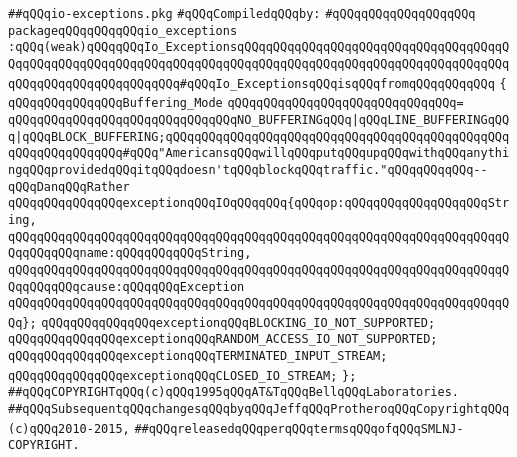 \label{src/lib/std/src/io/io-exceptions.pkg}
\verb|##qQQqio-exceptions.pkg|\newline
\newline
\verb|#qQQqCompiledqQQqby:|\newline
\verb|#qQQqqQQqqQQqqQQqqQQq|\newline
\newline
\verb|packageqQQqqQQqqQQqio_exceptions|\newline
\verb|:qQQq(weak)qQQqqQQqIo_ExceptionsqQQqqQQqqQQqqQQqqQQqqQQqqQQqqQQqqQQqqQQqqQQqqQQqqQQqqQQqqQQqqQQqqQQqqQQqqQQqqQQqqQQqqQQqqQQqqQQqqQQqqQQqqQQqqQQqqQQqqQQqqQQqqQQqqQQq#qQQqIo_ExceptionsqQQqisqQQqfromqQQqqQQqqQQq|\newline
\verb|{|\newline
\verb|qQQqqQQqqQQqqQQqBuffering_Mode|\newline
\verb|qQQqqQQqqQQqqQQqqQQqqQQqqQQqqQQq=|\newline
\verb|qQQqqQQqqQQqqQQqqQQqqQQqqQQqqQQqNO_BUFFERINGqQQq|\verb#|qQQqLINE_BUFFERINGqQQq|qQQqBLOCK_BUFFERING;qQQqqQQqqQQqqQQqqQQqqQQqqQQqqQQqqQQqqQQqqQQqqQQqqQQqqQQqqQQqqQQq#\verb|#qQQq"AmericansqQQqwillqQQqputqQQqupqQQqwithqQQqanythingqQQqprovidedqQQqitqQQqdoesn'tqQQqblockqQQqtraffic."qQQqqQQqqQQq--qQQqDanqQQqRather|\newline
\newline
\verb|qQQqqQQqqQQqqQQqexceptionqQQqIOqQQqqQQq{qQQqop:qQQqqQQqqQQqqQQqqQQqString,|\newline
\verb|qQQqqQQqqQQqqQQqqQQqqQQqqQQqqQQqqQQqqQQqqQQqqQQqqQQqqQQqqQQqqQQqqQQqqQQqqQQqqQQqname:qQQqqQQqqQQqString,|\newline
\verb|qQQqqQQqqQQqqQQqqQQqqQQqqQQqqQQqqQQqqQQqqQQqqQQqqQQqqQQqqQQqqQQqqQQqqQQqqQQqqQQqcause:qQQqqQQqException|\newline
\verb|qQQqqQQqqQQqqQQqqQQqqQQqqQQqqQQqqQQqqQQqqQQqqQQqqQQqqQQqqQQqqQQqqQQqqQQq};|\newline
\newline
\verb|qQQqqQQqqQQqqQQqexceptionqQQqBLOCKING_IO_NOT_SUPPORTED;|\newline
\verb|qQQqqQQqqQQqqQQqexceptionqQQqRANDOM_ACCESS_IO_NOT_SUPPORTED;|\newline
\verb|qQQqqQQqqQQqqQQqexceptionqQQqTERMINATED_INPUT_STREAM;|\newline
\verb|qQQqqQQqqQQqqQQqexceptionqQQqCLOSED_IO_STREAM;|\newline
\verb|};|\newline
\newline
\newline
\verb|##qQQqCOPYRIGHTqQQq(c)qQQq1995qQQqAT&TqQQqBellqQQqLaboratories.|\newline
\verb|##qQQqSubsequentqQQqchangesqQQqbyqQQqJeffqQQqProtheroqQQqCopyrightqQQq(c)qQQq2010-2015,|\newline
\verb|##qQQqreleasedqQQqperqQQqtermsqQQqofqQQqSMLNJ-COPYRIGHT.|\newline

